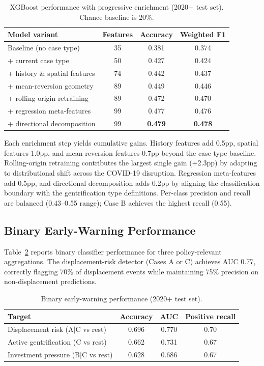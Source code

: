 \documentclass[12pt,a4paper]{article}
\begin{document}
\begin{table}[H]
\centering
\caption{XGBoost performance with progressive enrichment (2020+ test set). Chance baseline is 20\%.}
\label{tab:results}
\begin{tabular}{lccc}
\toprule
\textbf{Model variant} & \textbf{Features} & \textbf{Accuracy} & \textbf{Weighted F1} \\
\midrule
Baseline (no case type) & 35 & 0.381 & 0.374 \\
+ current case type & 50 & 0.427 & 0.424 \\
+ history \& spatial features & 74 & 0.442 & 0.437 \\
+ mean-reversion geometry & 89 & 0.449 & 0.446 \\
+ rolling-origin retraining & 89 & 0.472 & 0.470 \\
+ regression meta-features & 99 & 0.477 & 0.476 \\
+ directional decomposition & 99 & \textbf{0.479} & \textbf{0.478} \\
\bottomrule
\end{tabular}
\end{table}

Each enrichment step yields cumulative gains. History features add 0.5pp, spatial features 1.0pp, and mean-reversion features 0.7pp beyond the case-type baseline. Rolling-origin retraining contributes the largest single gain (+2.3pp) by adapting to distributional shift across the COVID-19 disruption. Regression meta-features add 0.5pp, and directional decomposition adds 0.2pp by aligning the classification boundary with the gentrification type definitions. Per-class precision and recall are balanced (0.43--0.55 range); Case B achieves the highest recall (0.55).

\subsection{Binary Early-Warning Performance}

Table~\ref{tab:binary} reports binary classifier performance for three policy-relevant aggregations. The displacement-risk detector (Cases A or C) achieves AUC 0.77, correctly flagging 70\% of displacement events while maintaining 75\% precision on non-displacement predictions.

\begin{table}[H]
\centering
\caption{Binary early-warning performance (2020+ test set).}
\label{tab:binary}
\begin{tabular}{lccc}
\toprule
\textbf{Target} & \textbf{Accuracy} & \textbf{AUC} & \textbf{Positive recall} \\
\midrule
Displacement risk (A$|$C vs rest) & 0.696 & 0.770 & 0.70 \\
Active gentrification (C vs rest) & 0.662 & 0.731 & 0.67 \\
Investment pressure (B$|$C vs rest) & 0.628 & 0.686 & 0.67 \\
\bottomrule
\end{tabular}
\end{table}
\end{document}
